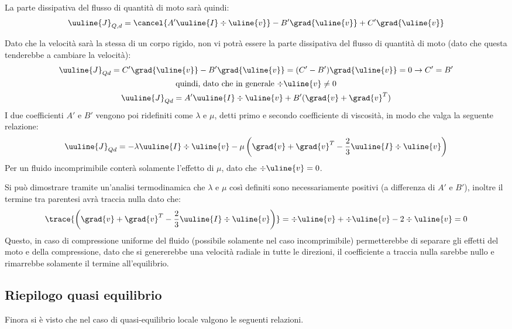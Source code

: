 La parte dissipativa del flusso di quantità di moto sarà quindi:
%
	\begin{equation*}
		 \uuline{J}_{Q,d} = \cancel{A' \uuline{I} \div{\uline{v}}} - B ' \grad{\uline{v}} + C' \grad{\uline{v}}
	\end{equation*}
%	

Dato che la velocità sarà la stessa di un corpo rigido, non vi potrà essere la parte dissipativa del flusso di quantità di moto (dato che questa tenderebbe a cambiare la velocità):
%
	\begin{equation*}
		\begin{gathered}
			\uuline{J}_{Qd} = C' \grad{\uline{v}} - B' \grad{\uline{v}} = (C' - B') \grad{\uline{v}} = 0 \rightarrow C' = B'\\
			\text{quindi, dato che in generale $\div{\uline{v}} \neq 0$}\\
			\uuline{J}_{Qd} = A' \uuline{I} \div{\uline{v}} + B' (\grad{v} + \grad{v}^T)
		\end{gathered}
	\end{equation*}
%
I due coefficienti $A'$ e $B'$ vengono poi ridefiniti come $\lambda$ e $\mu$, detti primo e secondo coefficiente di viscosità, in modo che valga la seguente relazione:
%
	\begin{equation*}
		\uuline{J}_{Qd} = - \lambda \uuline{I} \div{\uline{v}} - \mu \left( \grad{v} + \grad{v}^T - \frac{2}{3} \uuline{I} \div{\uline{v}} \right)
	\end{equation*}
%
Per un fluido incomprimibile conterà solamente l'effetto di $\mu$, dato che $\div{\uline{v}} = 0$.

Si può dimostrare tramite un'analisi termodinamica che $\lambda$ e $\mu$ così definiti sono necessariamente positivi (a differenza di $A'$ e $B'$), inoltre il termine tra parentesi avrà traccia nulla dato che:
%
	\begin{equation*}
		\trace{ \left( \grad{v} + \grad{v}^T - \frac{2}{3} \uuline{I} \div{\uline{v}} \right) } = \div{\uline{v}} + \div{\uline{v}} - 2 \div{\uline{v}} = 0
	\end{equation*}
%
Questo, in caso di compressione uniforme del fluido (possibile solamente nel caso incomprimibile) permetterebbe di separare gli effetti del moto e della compressione, dato che si genererebbe una velocità radiale in tutte le direzioni, il coefficiente a traccia nulla sarebbe nullo e  rimarrebbe solamente il termine all'equilibrio.

\subsection{Riepilogo quasi equilibrio}
Finora si è visto che nel caso di quasi-equilibrio locale valgono le seguenti relazioni.

